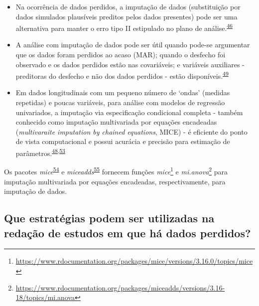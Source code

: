 \documentclass[
  a4paper,
]{book}
\renewcommand{\href}[2]{#2\footnote{\url{#1}}}
\newenvironment{infobox}[1]
  {
  \begin{itemize}
  \renewcommand{\labelitemi}{
    \raisebox{-.7\height}[0pt][0pt]{
      {\setkeys{Gin}{width=3em,keepaspectratio}
        \texttt{[image: \#1]}}
    }
  }
  \setlength{\fboxsep}{1em}
  \begin{blackbox}
  \item
  }
  {
  \end{blackbox}
  \end{itemize}
  }
\begin{document}
\begin{itemize}
\item
  Na ocorrência de dados perdidos, a imputação de dados (substituição por dados simulados plausíveis preditos pelos dados presentes) pode ser uma alternativa para manter o erro tipo II estipulado no plano de análise.\textsuperscript{\protect\hyperlink{ref-Altman2007}{46}}
\item
  A análise com imputação de dados pode ser útil quando pode-se argumentar que os dados foram perdidos ao acaso (MAR); quando o desfecho foi observado e os dados perdidos estão nas covariáveis; e variáveis auxiliares - preditoras do desfecho e não dos dados perdidos - estão disponíveis.\textsuperscript{\protect\hyperlink{ref-carpenter2021}{49}}
\item
  Em dados longitudinais com um pequeno número de `ondas' (medidas repetidas) e poucas variáveis, para análise com modelos de regressão univariados, a imputação via especificação condicional completa - também conhecido como imputação multivariada por equações encadeadas (\emph{multivaraite imputation by chained equations}, MICE) - é eficiente do ponto de vista computacional e possui acurácia e precisão para estimação de parâmetros.\textsuperscript{\protect\hyperlink{ref-Heymans2022}{48},\protect\hyperlink{ref-Cao2022}{53}}
\end{itemize}

\begin{infobox}{images/Rlogo}
Os pacotes \emph{mice}\textsuperscript{\protect\hyperlink{ref-mice}{54}} e \emph{miceadds}\textsuperscript{\protect\hyperlink{ref-miceadds}{55}} fornecem funções \href{https://www.rdocumentation.org/packages/mice/versions/3.16.0/topics/mice}{\emph{mice}} e \href{https://www.rdocumentation.org/packages/miceadds/versions/3.16-18/topics/mi.anova}{\emph{mi.anova}} para imputação multivariada por equações encadeadas, respectivamente, para imputação de dados.

\end{infobox}

\hypertarget{que-estratuxe9gias-podem-ser-utilizadas-na-redauxe7uxe3o-de-estudos-em-que-huxe1-dados-perdidos}{%
\subsection{Que estratégias podem ser utilizadas na redação de estudos em que há dados perdidos?}\label{que-estratuxe9gias-podem-ser-utilizadas-na-redauxe7uxe3o-de-estudos-em-que-huxe1-dados-perdidos}}
\end{document}
